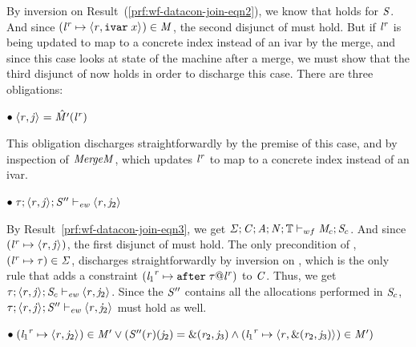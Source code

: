 \begin{bproof}
\begin{bcase}[\dregpardataconjoin{}]
\begin{enumerate}
\begin{itemize}
\begin{itemize}
\begin{itemize}
\begin{itemize}[label=$\circ$]
By inversion on Result~(\ref{prf:wf-datacon-join-eqn2}), we know that
 holds for $\mathit{S}$.
%
And since $({\mathit{l}}^{\mathit{r}} \mapsto \langle \mathit{r}, \texttt{ivar}\; x \rangle ^{}) \in \mathit{M}$,
the second disjunct of 
must hold.
%
But if ${\mathit{l}}^{\mathit{r}}$ is being updated to map to a concrete index instead of
an ivar by the merge,
and since this case looks at state of the machine after a merge,
we must show that the
third disjunct of
 now holds
in order to discharge this case.
%
There are three obligations:

$\bullet \; \langle \mathit{r}, \mathit{j} \rangle ^{} = \hat{\mathit{M}'}({\mathit{l}}^{\mathit{r}})$

This obligation discharges straightforwardly by the premise of this case,
and by inspection of $\mathit{MergeM}{}$, which updates ${\mathit{l}}^{\mathit{r}}$ to map to
a concrete index instead of an ivar.

$\bullet \; \mathit{\tau};\langle \mathit{r}, \mathit{j} \rangle ^{};\mathit{S}'' \vdash_{\textit{ew}} \langle \mathit{r}, \mathit{j}_2 \rangle ^{}$

By Result~\ref{prf:wf-datacon-join-eqn3}, we get
$\mathit{\Sigma};\mathit{C};\mathit{A};\mathit{N};\mathbb{T} \vdash_{wf} \mathit{M}_c;\mathit{S}_c$.
%
And since $({\mathit{l}}^{\mathit{r}} \mapsto \langle \mathit{r}, \mathit{j} \rangle ^{})$, the
first disjunct of  must hold.
%
The only precondition of ,
$({\mathit{l}}^{\mathit{r}} \mapsto \mathit{\tau}) \in \mathit{\Sigma}$,
discharges straightforwardly by inversion on \tllafter{}, which is the only rule that
adds a constraint $({\mathit{l}_1}^{\mathit{r}} \mapsto \texttt{after}\; \mathit{\tau} @ {\mathit{l}}^{\mathit{r}})$ to $\mathit{C}$.
%
Thus, we get
$\mathit{\tau};\langle \mathit{r}, \mathit{j} \rangle ^{};\mathit{S}_c \vdash_{\textit{ew}} \langle \mathit{r}, \mathit{j}_2 \rangle ^{}$.
%
Since the $\mathit{S}''$ contains all the allocations performed in $\mathit{S}_c$,
$\mathit{\tau};\langle \mathit{r}, \mathit{j} \rangle ^{};\mathit{S}'' \vdash_{\textit{ew}} \langle \mathit{r}, \mathit{j}_2 \rangle ^{}$ must
hold as well.

$\bullet \; ({\mathit{l}_1}^{\mathit{r}} \mapsto \langle \mathit{r}, \mathit{j}_2 \rangle ^{}) \in \mathit{M}' \vee
            (\mathit{S}''(\mathit{r})(\mathit{j}_2) = \text{\&}(\mathit{r}_2,\mathit{j}_3) \wedge
            ({\mathit{l}_1}^{\mathit{r}} \mapsto \langle \mathit{r}, \text{\&}(\mathit{r}_2,\mathit{j}_3) \rangle ^{}) \in \mathit{M}')
$


\end{itemize}
\end{itemize}
\end{itemize}
\end{itemize}
\end{enumerate}
\end{bcase}
\end{bproof}

